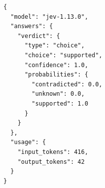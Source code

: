 \begin{lstlisting}
{
  "model": "jev-1.13.0",
  "answers": {
    "verdict": {
      "type": "choice",
      "choice": "supported",
      "confidence": 1.0,
      "probabilities": {
        "contradicted": 0.0,
        "unknown": 0.0,
        "supported": 1.0
      }
    }
  },
  "usage": {
    "input_tokens": 416,
    "output_tokens": 42
  }
}
\end{lstlisting}
